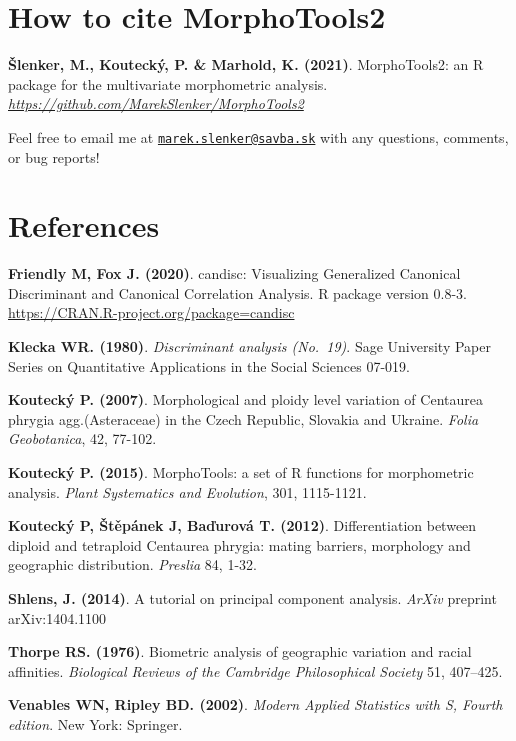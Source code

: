 \documentclass[
]{article}
\begin{document}
\hypertarget{how-to-cite-morphotools2}{%
\section{How to cite MorphoTools2}\label{how-to-cite-morphotools2}}

\textbf{Šlenker, M., Koutecký, P. \& Marhold, K. (2021)}. MorphoTools2:
an R package for the multivariate morphometric analysis.
\emph{\url{https://github.com/MarekSlenker/MorphoTools2}}

Feel free to email me at
\href{mailto:marek.slenker@savba.sk}{\nolinkurl{marek.slenker@savba.sk}}
with any questions, comments, or bug reports!

\hypertarget{references}{%
\section{References}\label{references}}

\textbf{Friendly M, Fox J. (2020)}. candisc: Visualizing Generalized
Canonical Discriminant and Canonical Correlation Analysis. R package
version 0.8-3. \url{https://CRAN.R-project.org/package=candisc}

\textbf{Klecka WR. (1980)}. \emph{Discriminant analysis (No.~19)}. Sage
University Paper Series on Quantitative Applications in the Social
Sciences 07-019.

\textbf{Koutecký P. (2007)}. Morphological and ploidy level variation of
Centaurea phrygia agg.(Asteraceae) in the Czech Republic, Slovakia and
Ukraine. \emph{Folia Geobotanica}, 42, 77-102.

\textbf{Koutecký P. (2015)}. MorphoTools: a set of R functions for
morphometric analysis. \emph{Plant Systematics and Evolution}, 301,
1115-1121.

\textbf{Koutecký P, Štěpánek J, Baďurová T. (2012)}. Differentiation
between diploid and tetraploid Centaurea phrygia: mating barriers,
morphology and geographic distribution. \emph{Preslia} 84, 1-32.

\textbf{Shlens, J. (2014)}. A tutorial on principal component analysis.
\emph{ArXiv} preprint arXiv:1404.1100

\textbf{Thorpe RS. (1976)}. Biometric analysis of geographic variation
and racial affinities. \emph{Biological Reviews of the Cambridge
Philosophical Society} 51, 407--425.

\textbf{Venables WN, Ripley BD. (2002)}. \emph{Modern Applied Statistics
with S, Fourth edition}. New York: Springer.
\end{document}
